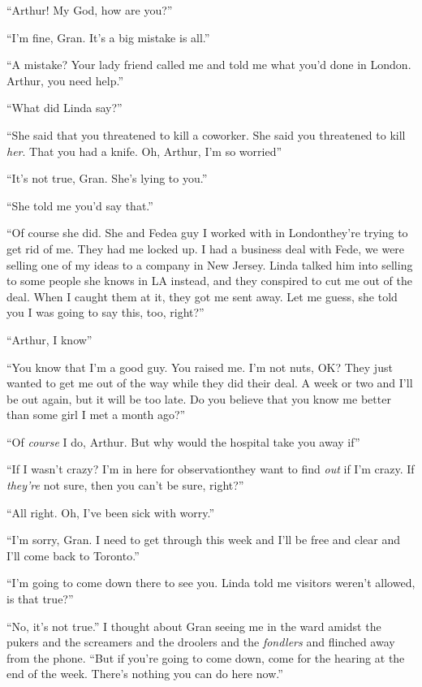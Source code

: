 “Arthur! My God, how are you?”

“I’m fine, Gran. It’s a big mistake is all.”

“A mistake? Your lady friend called me and told me what you’d done
in London. Arthur, you need help.”

“What did Linda say?”

“She said that you threatened to kill a coworker. She said you
threatened to kill \emph{her}. That you had a knife. Oh, Arthur,
I’m so worried{\dash}”

“It’s not true, Gran. She’s lying to you.”

“She told me you’d say that.”

“Of course she did. She and Fede{\dash}a guy I worked with in
London{\dash}they’re trying to get rid of me. They had me locked up. I
had a business deal with Fede, we were selling one of my ideas to a
company in New Jersey. Linda talked him into selling to some people
she knows in LA instead, and they conspired to cut me out of the
deal. When I caught them at it, they got me sent away. Let me
guess, she told you I was going to say this, too, right?”

“Arthur, I know{\dash}”

“You know that I’m a good guy. You raised me. I’m not nuts, OK?
They just wanted to get me out of the way while they did their
deal. A week or two and I’ll be out again, but it will be too late.
Do you believe that you know me better than some girl I met a month
ago?”

“Of \emph{course} I do, Arthur. But why would the hospital take you
away if{\dash}”

“If I wasn’t crazy? I’m in here for observation{\dash}they want to find
\emph{out} if I’m crazy. If \emph{they’re} not sure, then you can’t
be sure, right?”

“All right. Oh, I’ve been sick with worry.”

“I’m sorry, Gran. I need to get through this week and I’ll be free
and clear and I’ll come back to Toronto.”

“I’m going to come down there to see you. Linda told me visitors
weren’t allowed, is that true?”

“No, it’s not true.” I thought about Gran seeing me in the ward
amidst the pukers and the screamers and the droolers and the
\emph{fondlers} and flinched away from the phone. “But if you’re
going to come down, come for the hearing at the end of the week.
There’s nothing you can do here now.”

